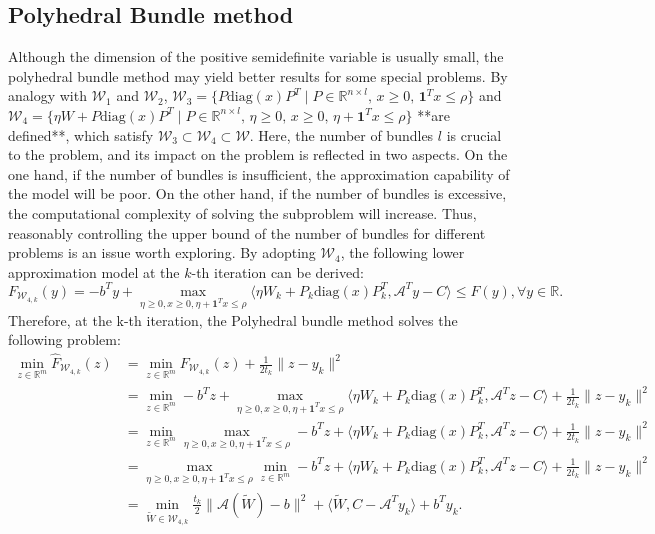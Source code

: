 \documentclass{jcmlatex}
\begin{document}
\subsection{Polyhedral Bundle method}
Although the dimension of the positive semidefinite variable is usually small, the polyhedral bundle method may yield better results for some special problems. By analogy with \(\mathcal{W}_1\) and \(\mathcal{W}_2\), \(\mathcal{W}_3 = \{ P\text{diag}(x)P^T \mid P \in \mathbb{R}^{n \times l},\, x \geq 0,\, \mathbf{1}^T x \leq \rho \}\) and \(\mathcal{W}_4 = \{ \eta W + P\text{diag}(x)P^T \mid P \in \mathbb{R}^{n \times l},\, \eta \geq 0,\, x \geq 0,\, \eta + \mathbf{1}^T x \leq \rho \}\) **are defined**, which satisfy \(\mathcal{W}_3 \subset \mathcal{W}_4 \subset \mathcal{W}\). Here, the number of bundles \(l\) is crucial to the problem, and its impact on the problem is reflected in two aspects. On the one hand, if the number of bundles is insufficient, the approximation capability of the model will be poor. On the other hand, if the number of bundles is excessive, the computational complexity of solving the subproblem will increase. Thus, reasonably controlling the upper bound of the number of bundles for different problems is an issue worth exploring. By adopting \(\mathcal{W}_4\), the following lower approximation model at the \(k\)-th iteration can be derived:
\begin{equation*}
F_{\mathcal{W}_{4,k}}(y)=-b^{T}y+\underset{\eta \geq 0, x \geq 0, \eta + \mathbf{1}^{T}x \leq \rho}{\max}\langle \eta W_{k} + P_{k}\text{diag}(x)P_{k}^{T}, \mathcal{A}^{T}y-C\rangle\leq F(y),\forall y\in \mathbb{R}.
\end{equation*}
Therefore, at the k-th iteration, the Polyhedral bundle method solves the following problem:
\begin{equation}\label{eq:sub3}
\begin{aligned}
\underset{z\in\mathbb{R}^{m}}{\min}\hat{F}_{\mathcal{W}_{4,k}}(z)&=
\underset{z\in\mathbb{R}^{m}}{\min}F_{\mathcal{W}_{4,k}}(z)+\frac{1}{2t_{k}}\|z-y_{k}\|^{2}\\
&=\underset{z\in\mathbb{R}^{m}}{\min}-b^{T}z+\underset{\eta \geq 0, x \geq 0, \eta + \mathbf{1}^{T}x \leq \rho}{\max}\langle\eta W_{k} + P_{k}\text{diag}(x)P_{k}^{T}, \mathcal{A}^{T}z-C\rangle+\frac{1}{2t_{k}}\|z-y_{k}\|^{2}\\
&=\underset{z\in\mathbb{R}^{m}}{\min}\underset{\eta \geq 0, x \geq 0, \eta + \mathbf{1}^{T}x \leq \rho}{\max}-b^{T}z+\langle\eta W_{k} + P_{k}\text{diag}(x)P_{k}^{T}, \mathcal{A}^{T}z-C\rangle+\frac{1}{2t_{k}}\|z-y_{k}\|^{2}\\ 
&=\underset{\eta \geq 0, x \geq 0, \eta + \mathbf{1}^{T}x \leq \rho}{\max}\underset{z\in\mathbb{R}^{m}}{\min}-b^{T}z+\langle\eta W_{k} + P_{k}\text{diag}(x)P_{k}^{T}, \mathcal{A}^{T}z-C\rangle+\frac{1}{2t_{k}}\|z-y_{k}\|^{2}\\ 
&=\underset{\tilde{W}\in \mathcal{W}_{4,k}}{\min}\frac{t_{k}}{2}\| \mathcal{A}(\tilde{W})-b\|^{2}+\langle \tilde{W}, C-\mathcal{A}^{T}y_{k}\rangle+b^{T}y_{k}.
\end{aligned}
\end{equation}
\end{document}
